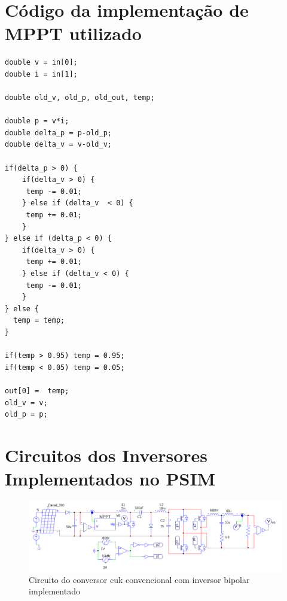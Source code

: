 \documentclass[
	12pt,				%
	openany,
	onseside,
	a4paper,			%
	english,			%
	french,				%
	spanish,			%
	brazil,				%
	]{abntex2}
\begin{document}
\begin{anexosenv}

\partanexos

\chapter{Código da implementação de MPPT utilizado}\label{anex:mppt_code}


\begin{lstlisting}
double v = in[0];
double i = in[1];

double old_v, old_p, old_out, temp;

double p = v*i;
double delta_p = p-old_p;
double delta_v = v-old_v;

if(delta_p > 0) {
    if(delta_v > 0) {
     temp -= 0.01;
    } else if (delta_v  < 0) {
     temp += 0.01;
    }
} else if (delta_p < 0) {
    if(delta_v > 0) {
     temp += 0.01;
    } else if (delta_v < 0) {
     temp -= 0.01;
    }
} else {
  temp = temp;
}

if(temp > 0.95) temp = 0.95;
if(temp < 0.05) temp = 0.05;

out[0] =  temp;
old_v = v;
old_p = p;
\end{lstlisting}

\chapter{Circuitos dos Inversores Implementados no PSIM} \label{anex:circ_images}

\begin{figure}
	\centering
	\includegraphics[width=\linewidth]{comp_conv_circ_clean}
	\caption{Circuito do conversor cuk convencional com inversor bipolar implementado}	


\end{figure}
\end{anexosenv}
\end{document}
